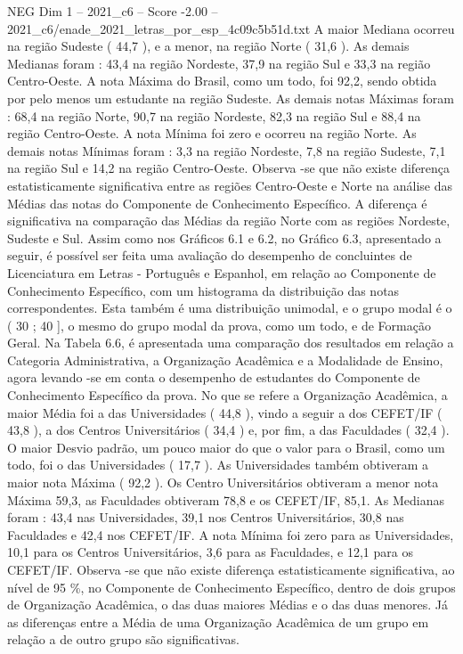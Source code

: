 \begin{textsample}{NEG Dim 1 – 2021\_c6 – Score -2.00 – 2021\_c6/enade\_2021\_letras\_por\_esp\_4c09c5b51d.txt}
A maior Mediana ocorreu na região Sudeste ( 44,7 ), e a menor, na região Norte ( 31,6 ).
As demais Medianas foram : 43,4 na região Nordeste, 37,9 na região Sul e 33,3 na região Centro-Oeste.
A nota Máxima do Brasil, como um todo, foi 92,2, sendo obtida por pelo menos um estudante na região Sudeste.
As demais notas Máximas foram : 68,4 na região Norte, 90,7 na região Nordeste, 82,3 na região Sul e 88,4 na região Centro-Oeste.
A nota Mínima foi zero e ocorreu na região Norte.
As demais notas Mínimas foram : 3,3 na região Nordeste, 7,8 na região Sudeste, 7,1 na região Sul e 14,2 na região Centro-Oeste.
Observa -se que não existe diferença estatisticamente significativa entre as regiões Centro-Oeste e Norte na análise das Médias das notas do Componente de Conhecimento Específico.
A diferença é significativa na comparação das Médias da região Norte com as regiões Nordeste, Sudeste e Sul.
Assim como nos Gráficos 6.1 e 6.2, no Gráfico 6.3, apresentado a seguir, é possível ser feita uma avaliação do desempenho de concluintes de Licenciatura em Letras - Português e Espanhol, em relação ao Componente de Conhecimento Específico, com um histograma da distribuição das notas correspondentes.
Esta também é uma distribuição unimodal, e o grupo modal é o ( 30 ; 40 ], o mesmo do grupo modal da prova, como um todo, e de Formação Geral.
Na Tabela 6.6, é apresentada uma comparação dos resultados em relação a Categoria Administrativa, a Organização Acadêmica e a Modalidade de Ensino, agora levando -se em conta o desempenho de estudantes do Componente de Conhecimento Específico da prova.
No que se refere a Organização Acadêmica, a maior Média foi a das Universidades ( 44,8 ), vindo a seguir a dos CEFET/IF ( 43,8 ), a dos Centros Universitários ( 34,4 ) e, por fim, a das Faculdades ( 32,4 ).
O maior Desvio padrão, um pouco maior do que o valor para o Brasil, como um todo, foi o das Universidades ( 17,7 ).
As Universidades também obtiveram a maior nota Máxima ( 92,2 ).
Os Centro Universitários obtiveram a menor nota Máxima 59,3, as Faculdades obtiveram 78,8 e os CEFET/IF, 85,1.
As Medianas foram : 43,4 nas Universidades, 39,1 nos Centros Universitários, 30,8 nas Faculdades e 42,4 nos CEFET/IF.
A nota Mínima foi zero para as Universidades, 10,1 para os Centros Universitários, 3,6 para as Faculdades, e 12,1 para os CEFET/IF.
Observa -se que não existe diferença estatisticamente significativa, ao nível de 95 \%, no Componente de Conhecimento Específico, dentro de dois grupos de Organização Acadêmica, o das duas maiores Médias e o das duas menores.
Já as diferenças entre a Média de uma Organização Acadêmica de um grupo em relação a de outro grupo são significativas.

\end{textsample}
